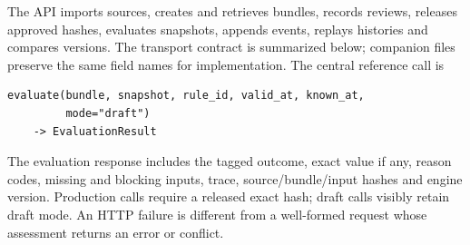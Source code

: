 \label{merge:P-03c-storage-review:02}


The API imports sources, creates and retrieves bundles, records reviews, releases
approved hashes, evaluates snapshots, appends events, replays histories and
compares versions. The transport contract is summarized below; companion files
preserve the same field names for implementation. The central reference call is

\begin{minipage}{\textwidth}
\begin{lstlisting}
evaluate(bundle, snapshot, rule_id, valid_at, known_at,
         mode="draft")
    -> EvaluationResult
\end{lstlisting}
\end{minipage}

The evaluation response includes the tagged outcome, exact value if any, reason codes,
missing and blocking inputs, trace, source/bundle/input hashes and engine version.
Production calls require a released exact hash; draft calls visibly retain draft
mode. An HTTP failure is different from a well-formed request whose assessment
returns an error or conflict.

